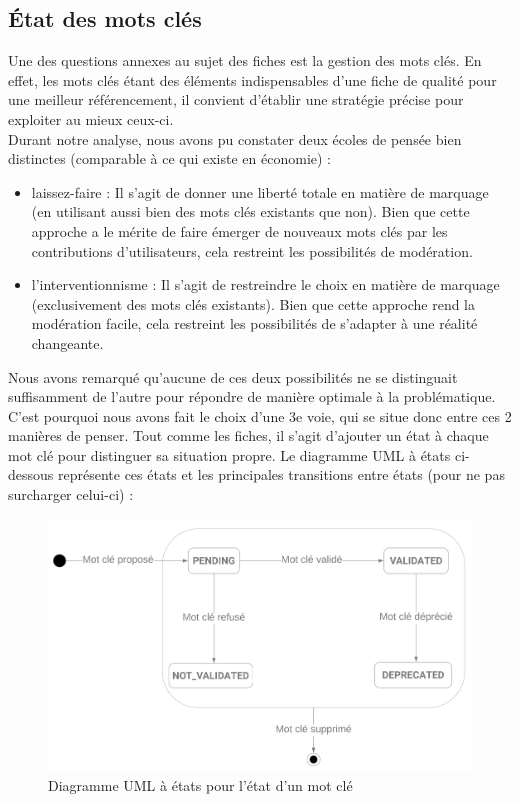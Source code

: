 \subsection*{État des mots clés}

Une des questions annexes au sujet des fiches est la gestion des mots clés. En effet, les mots clés étant des éléments indispensables d'une fiche de qualité pour une meilleur référencement, il convient d'établir une stratégie précise pour exploiter au mieux ceux-ci. \\

Durant notre analyse, nous avons pu constater deux écoles de pensée bien distinctes (comparable à ce qui existe en économie) : 
\pagebreak
\begin{itemize}
    \item laissez-faire : Il s'agit de donner une liberté totale en matière de marquage (en utilisant aussi bien des mots clés existants que non). Bien que cette approche a le mérite de faire émerger de nouveaux mots clés par les contributions d'utilisateurs, cela restreint les possibilités de modération.
    \item l'interventionnisme : Il s'agit de restreindre le choix en matière de marquage (exclusivement des mots clés existants). Bien que cette approche rend la modération facile, cela restreint les possibilités de s'adapter à une réalité changeante.
\end{itemize}

Nous avons remarqué qu'aucune de ces deux possibilités ne se distinguait suffisamment de l'autre pour répondre de manière optimale à la problématique.
C'est pourquoi nous avons fait le choix d'une 3e voie, qui se situe donc entre ces 2 manières de penser. Tout comme les fiches, il s'agit d'ajouter un état à chaque mot clé pour distinguer sa situation propre. Le diagramme UML à états ci-dessous représente ces états et les principales transitions entre états (pour ne pas surcharger celui-ci) :

\begin{figure}[H]
    \includegraphics[width=\textwidth,height=\textheight,keepaspectratio]{images/StateTags.png}
    \centering
    \caption{Diagramme UML à états pour l'état d'un mot clé}
    \label{pic:stateDiagramForTags}
\end{figure}

